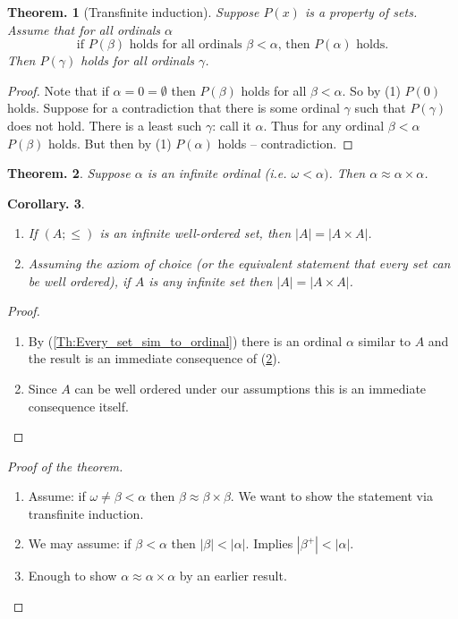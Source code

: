 \documentclass[a4paper,oneside,11pt,DIV=12,parskip=half]{scrartcl}
\theoremstyle{plain}
\newtheorem{theorem}{Theorem.}[section]
\newtheorem{corollary}[theorem]{Corollary.}
\theoremstyle{definition}
\newtheorem{remark, definition}[theorem]{Remark and Definition.}
\newtheorem{lemma, definition}[theorem]{Lemma and Definition.}
\newtheorem{theorem, definition}[theorem]{Theorem and Definition.}
\theoremstyle{remark}
\newtheorem*{remark, example}{\textbf{Remark and Exercise}}
\begin{document}
\begin{theorem}[Transfinite induction]\label{Th:transfinite_induction}
Suppose $P(x)$ is a property of sets. Assume that for all ordinals $\alpha$ 
    \begin{equation}
        \text{if $P(\beta)$ holds for all ordinals $\beta < \alpha$, then $P(\alpha) $ holds.}
    \end{equation}
Then $P(\gamma)$ holds for all ordinals $\gamma$.
\end{theorem}

\begin{proof}
Note that if $\alpha = 0 = \emptyset$ then $P(\beta)$ holds for all $\beta < \alpha$. So by (1) $P(0)$ holds. Suppose for a contradiction that there is some ordinal $\gamma$ such that $P(\gamma)$ does not hold. There is a least such $\gamma$: call it $\alpha$. Thus for any ordinal $\beta < \alpha$ $P(\beta)$ holds. But then by (1) $P(\alpha)$ holds -- contradiction.
\end{proof}

\begin{theorem}\label{Th:|A|=|AxA|}
Suppose $\alpha$ is an infinite ordinal (i.e. $\omega < \alpha)$. Then $\alpha \approx \alpha \times \alpha$.
\end{theorem}

\begin{corollary}
\begin{enumerate}
    \item If $(A; \leq)$ is an infinite well-ordered set, then $|A| = |A \times A|$.
    \item Assuming the axiom of choice (or the equivalent statement that every set can be well ordered), if $A$ is any infinite set then $|A| = |A \times A|$. 
\end{enumerate}
\end{corollary}

\begin{proof}
\begin{enumerate}
    \item By (\ref{Th:Every_set_sim_to_ordinal}) there is an ordinal $\alpha$ similar to $A$ and the result is an immediate consequence of (\ref{Th:|A|=|AxA|}).
    \item Since $A$ can be well ordered under our assumptions this is an immediate consequence itself.
\end{enumerate}
\end{proof}

\begin{proof}[Proof of the theorem]
\begin{enumerate}
    \item Assume: if $\omega \neq \beta < \alpha$ then $\beta \approx \beta \times \beta$. We want to show the statement via transfinite induction.
    \item We may assume: if $\beta < \alpha$ then $|\beta| < |\alpha|$. Implies $|\beta^+| < |\alpha|$.
    \item Enough to show $\alpha \approx \alpha \times \alpha$ by an earlier result.
\end{enumerate}
\end{proof}
\end{document}
